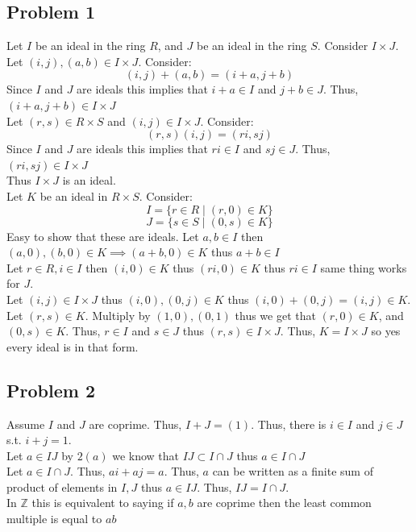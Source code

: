 \documentclass[12pt, letterpaper]{article}
\theoremstyle{definition}
\newcommand{\Z}{\mathbb{Z}}
\begin{document}
\pagestyle{fancy}
\fancyhf{}
\fancyhead[ROE]{\thepage}

\subsection*{Problem 1}
Let $I$ be an ideal in the ring $R$, and $J$ be an ideal in the ring $S$. Consider $I \times J$.\\
Let $(i,j),(a,b) \in I \times J$. Consider:
\[(i,j)+(a,b)=(i+a,j+b)\]
Since $I$ and $J$ are ideals this implies that $i+a \in I$ and $j+b \in J$. Thus, $(i+a,j+b) \in I \times J$\\
Let $(r,s) \in R \times S$ and $(i,j) \in I \times J$. Consider:
\[(r,s)(i,j)=(ri,sj)\]
Since $I$ and $J$ are ideals this implies that $ri \in I$ and $sj \in J$. Thus, $(ri,sj) \in I \times J$\\
Thus $I \times J$ is an ideal.\\
Let $K$ be an ideal in $R \times S$. Consider:
\[I = \{r \in R \mid (r,0) \in K\}\]
\[J = \{s \in S \mid (0,s) \in K\}\]
Easy to show that these are ideals. Let $a, b \in I$ then $(a,0),(b,0) \in K \implies (a+b,0) \in K$ thus $a+b \in I$\\
Let $r \in R, i \in I$ then $(i,0) \in K$ thus $(ri,0) \in K$ thus $ri \in I$ same thing works for $J$.\\
Let $(i,j) \in I \times J$ thus $(i,0),(0,j)\in K$ thus $(i,0)+(0,j)=(i,j)\in K$.\\
Let $(r,s) \in K$. Multiply by $(1,0),(0,1)$ thus we get that $(r,0) \in K$, and $(0,s) \in K$. Thus, $r\in I$ and $s \in J$ thus $(r,s) \in I \times J$. Thus, $K=I \times J$ so yes every ideal is in that form.

\newpage
\subsection*{Problem 2}
Assume $I$ and $J$ are coprime. Thus, $I+J=(1)$. Thus, there is $i \in I$ and $j \in J$ s.t. $i+j=1$.\\
Let $a \in IJ$ by $2(a)$ we know that $IJ \subset I \cap J$ thus $a \in I \cap J$\\
Let $a \in I \cap J$. Thus, $ai+aj=a$. Thus, $a$ can be written as a finite sum of product of elements in $I,J$ thus $a \in IJ$. Thus, $IJ= I \cap J$.\\
In $\Z$ this is equivalent to saying if $a,b$ are coprime then the least common multiple is equal to $ab$
\end{document}
